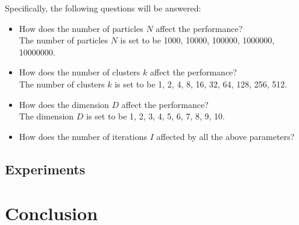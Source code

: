 \documentclass[12pt]{article}
\begin{document}

Specifically, the following questions will be answered:

\begin{itemize}
    \item How does the number of particles $N$ affect the performance?
\\The number of particles $N$ is set to be 1000, 10000, 100000, 1000000, 10000000.
    \item How does the number of clusters $k$ affect the performance?
\\The number of clusters $k$ is set to be 1, 2, 4, 8, 16, 32, 64, 128, 256, 512.
    \item How does the dimension $D$ affect the performance?
\\The dimension $D$ is set to be 1, 2, 3, 4, 5, 6, 7, 8, 9, 10.
    \item How does the number of iterations $I$ affected by all the above parameters?
\end{itemize}



\subsection{Experiments}



\section{Conclusion}

%
%
\end{document}
